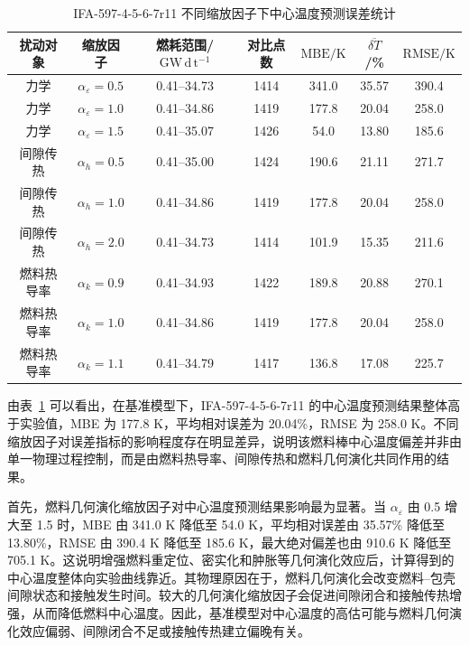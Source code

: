 \begin{table}[htbp]
	\centering
	\caption{IFA-597-4-5-6-7r11 不同缩放因子下中心温度预测误差统计}
	\label{tab:ifa597r11_temperature_alpha_sensitivity_error}
	\begin{tabular*}{\textwidth}{
			@{\extracolsep{\fill}}
			ccccccc
			@{}
		}
		\toprule
		\multicolumn{1}{c}{扰动对象} & \multicolumn{1}{c}{缩放因子} & 燃耗范围/$\mathrm{GW\,d\,t^{-1}}$ & 对比点数 & $\mathrm{MBE}/\mathrm{K}$ & $\overline{\delta T}$/\% & $\mathrm{RMSE}/\mathrm{K}$ \\
		\midrule
		力学 & $\alpha_{\varepsilon}=0.5$ & 0.41--34.73 & 1414 & 341.0 & 35.57 & 390.4 \\
		力学 & $\alpha_{\varepsilon}=1.0$ & 0.41--34.86 & 1419 & 177.8 & 20.04 & 258.0 \\
		力学 & $\alpha_{\varepsilon}=1.5$ & 0.41--35.07 & 1426 & 54.0 & 13.80 & 185.6 \\
		间隙传热 & $\alpha_h=0.5$ & 0.41--35.00 & 1424 & 190.6 & 21.11 & 271.7 \\
		间隙传热 & $\alpha_h=1.0$ & 0.41--34.86 & 1419 & 177.8 & 20.04 & 258.0 \\
		间隙传热 & $\alpha_h=2.0$ & 0.41--34.73 & 1414 & 101.9 & 15.35 & 211.6 \\
		燃料热导率 & $\alpha_k=0.9$ & 0.41--34.93 & 1422 & 189.8 & 20.88 & 270.1 \\
		燃料热导率 & $\alpha_k=1.0$ & 0.41--34.86 & 1419 & 177.8 & 20.04 & 258.0 \\
		燃料热导率 & $\alpha_k=1.1$ & 0.41--34.79 & 1417 & 136.8 & 17.08 & 225.7 \\
		\bottomrule
	\end{tabular*}
\end{table}

由表~\ref{tab:ifa597r11_temperature_alpha_sensitivity_error} 可以看出，在基准模型下，IFA-597-4-5-6-7r11 的中心温度预测结果整体高于实验值，MBE 为 177.8 K，平均相对误差为 20.04\%，RMSE 为 258.0 K。不同缩放因子对误差指标的影响程度存在明显差异，说明该燃料棒中心温度偏差并非由单一物理过程控制，而是由燃料热导率、间隙传热和燃料几何演化共同作用的结果。

首先，燃料几何演化缩放因子对中心温度预测结果影响最为显著。当 \(\alpha_{\varepsilon}\) 由 0.5 增大至 1.5 时，MBE 由 341.0 K 降低至 54.0 K，平均相对误差由 35.57\% 降低至 13.80\%，RMSE 由 390.4 K 降低至 185.6 K，最大绝对偏差也由 910.6 K 降低至 705.1 K。这说明增强燃料重定位、密实化和肿胀等几何演化效应后，计算得到的中心温度整体向实验曲线靠近。其物理原因在于，燃料几何演化会改变燃料--包壳间隙状态和接触发生时间。较大的几何演化缩放因子会促进间隙闭合和接触传热增强，从而降低燃料中心温度。因此，基准模型对中心温度的高估可能与燃料几何演化效应偏弱、间隙闭合不足或接触传热建立偏晚有关。

